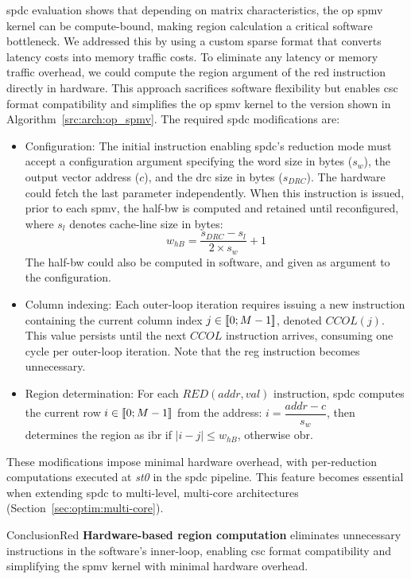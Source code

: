 \acrlong{spdc} evaluation shows that depending on matrix characteristics, the \acrshort{op} \acrshort{spmv} kernel can be compute-bound, making region calculation a critical software bottleneck.
We addressed this by using a custom sparse format that converts latency costs into memory traffic costs.
To eliminate any latency or memory traffic overhead, we could compute the region argument of the \acrshort{red} instruction directly in hardware.
This approach sacrifices software flexibility but enables \acrshort{csc} format compatibility and simplifies the \acrshort{op} \acrshort{spmv} kernel to the version shown in Algorithm~\ref{src:arch:op_spmv}.
The required \acrlong{spdc} modifications are:
\begin{itemize}
    \item Configuration: The initial instruction enabling \acrlong{spdc}'s \gls{reduction} mode must accept a configuration argument specifying the word size in bytes ($s_w$), the output vector address ($c$), and the \acrshort{drc} size in bytes ($s_\mathit{DRC}$).
    The hardware could fetch the last parameter independently.
    When this instruction is issued, prior to each \acrshort{spmv}, the half-\gls{bw} is computed and retained until reconfigured, where $s_l$ denotes cache-line size in bytes:
    $$w_\mathit{hB} = \dfrac{s_\mathit{DRC}-s_l}{2 \times s_w}+1$$
    The half-\gls{bw} could also be computed in software, and given as argument to the configuration.
    \item Column indexing: Each outer-loop iteration requires issuing a new instruction containing the current column index $j \in [\![ 0; M-1 ]\!]$, denoted $CCOL(j)$.
    This value persists until the next $CCOL$ instruction arrives, consuming one cycle per outer-loop iteration.
    Note that the \acrshort{reg} instruction becomes unnecessary.
    \item Region determination: For each $RED(addr, val)$ instruction, \acrlong{spdc} computes the current row $i \in [\![ 0; M-1 ]\!]$ from the address: $i = \dfrac{addr-c}{s_w}$, then determines the region as \acrshort{ibr} if $|i-j| \leqslant w_\mathit{hB}$, otherwise \acrshort{obr}.
\end{itemize}
These modifications impose minimal hardware overhead, with per-\gls{reduction} computations executed at \textit{st0} in the \acrlong{spdc} \gls{pipeline}.
This feature becomes essential when extending \acrlong{spdc} to multi-level, multi-core architectures (Section~\ref{sec:optim:multi-core}).

\begin{highlight}{Conclusion}{Red}
    \textbf{Hardware-based region computation} eliminates unnecessary instructions in the software's inner-loop, enabling \acrshort{csc} format compatibility and simplifying the \acrshort{spmv} kernel with minimal hardware overhead.
\end{highlight}

